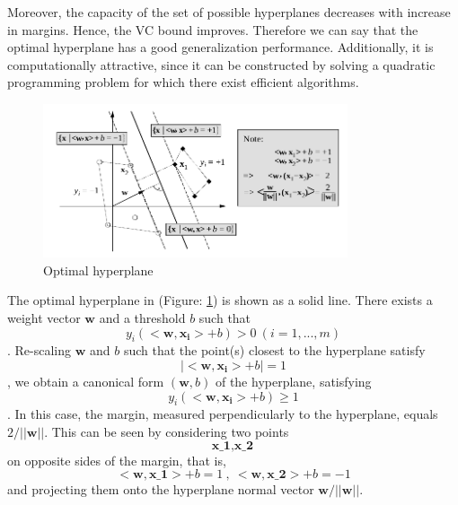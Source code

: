 \documentclass{article}
\begin{document}
Moreover, the capacity of the set of possible hyperplanes decreases with increase in margins. Hence, the VC bound improves. Therefore we can say that the optimal hyperplane has a good generalization performance. Additionally, it is computationally attractive, since it can be constructed by solving a quadratic programming problem for which there exist efficient algorithms.

\begin{figure}
  \centering
  \includegraphics[width=0.8\textwidth]{hyperplane.png}
  \caption{Optimal hyperplane}
    \label{fig:hyperplane}
\end{figure}

The optimal hyperplane in (Figure: \ref{fig:hyperplane}) is shown as a solid line. There exists a weight vector $\bm{w}$ and a threshold $b$ such that 
\begin{equation*}
y_i(<\bm{w}, \bm{x_i} > + b) > 0 \ (i = 1, . . . , m)
\end{equation*} 
. Re-scaling $\bm{w}$ and $b$ such that the point(s) closest to the hyperplane satisfy 
\begin{equation*}
 |<\bm{w}, \bm{x_i}> + b| = 1   
\end{equation*}
, we obtain a canonical form $(\bm{w}, b)$ of the hyperplane, satisfying
\begin{equation*}
 y_i(<\bm{w}, \bm{x_i}> + b) \geq 1   
\end{equation*}
 . In this case, the margin, measured perpendicularly to the hyperplane, equals $2/||\bm{w}||$. This can be seen by considering two points \begin{equation*}
 \textbf{x_1}, \textbf{x_2}
 \end{equation*}
 on opposite sides of the margin, that is, 
 \begin{equation*}
 <\bm{w}, \textbf{x_1}> + b = 1 \ , \ <\bm{w}, \textbf{x_2}> + b = -1
 \end{equation*}
   and projecting them onto the hyperplane
normal vector $\bm{w}/||\bm{w}||$.
\end{document}
